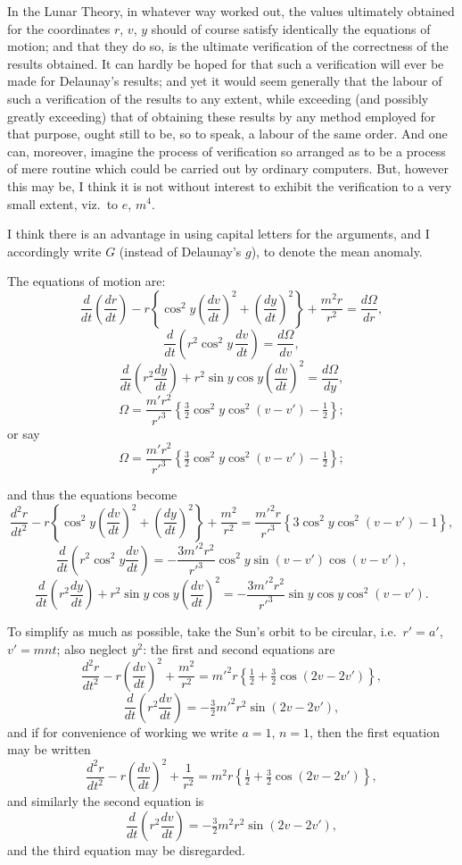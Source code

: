 \documentclass[11pt,a4paper]{article}
\begin{document}
In the Lunar Theory, in whatever way worked out, the values ultimately obtained for the coordinates $r$, $v$, $y$ should of course satisfy identically the equations of motion; and that they do so, is the ultimate verification of the correctness of the results obtained. It can hardly be hoped for that such a verification will ever be made for Delaunay's results; and yet it would seem generally that the labour of such a verification of the results to any extent, while exceeding (and possibly greatly exceeding) that of obtaining these results by any method employed for that purpose, ought still to be, so to speak, a labour of the same order. And one can, moreover, imagine the process of verification so arranged as to be a process of mere routine which could be carried out by ordinary computers. But, however this may be, I think it is not without interest to exhibit the verification to a very small extent, viz.\ to $e$, $m^4$.

I think there is an advantage in using capital letters for the arguments, and I accordingly write $G$ (instead of Delaunay's $g$), to denote the mean anomaly.

The equations of motion are:
\[
\frac{d}{dt}\!\left(\frac{dr}{dt}\right) - r\left\{\cos^2 y\left(\frac{dv}{dt}\right)^2 + \left(\frac{dy}{dt}\right)^2\right\} + \frac{m^2 r}{r^2} = \frac{d\Omega}{dr},
\]
\[
\frac{d}{dt}\!\left(r^2 \cos^2 y \,\frac{dv}{dt}\right) = \frac{d\Omega}{dv},
\]
\[
\frac{d}{dt}\!\left(r^2 \frac{dy}{dt}\right) + r^2 \sin y \cos y \left(\frac{dv}{dt}\right)^2 = \frac{d\Omega}{dy},
\]
\[
\Omega = \frac{m'r^2}{r'^3}\!\left\{\tfrac{3}{2}\cos^2 y \cos^2 (v - v') - \tfrac{1}{2}\right\};
\]
or say
\[
\Omega = \frac{m'r^2}{r'^3}\!\left\{\tfrac{3}{2}\cos^2 y \cos^2(v - v') - \tfrac{1}{2}\right\};
\]

and thus the equations become
\[
\frac{d^2 r}{dt^2} - r\!\left\{\cos^2 y\!\left(\frac{dv}{dt}\right)^{\!2} + \!\left(\frac{dy}{dt}\right)^{\!2}\right\} + \frac{m^2}{r^2} = \frac{m'^2 r}{r'^3}\!\left\{3\cos^2 y \cos^2(v - v') - 1\right\},
\]
\[
\frac{d}{dt}\!\left(r^2 \cos^2 y \frac{dv}{dt}\right) = -\frac{3 m'^2 r^2}{r'^3}\cos^2 y \sin(v - v')\cos(v - v'),
\]
\[
\frac{d}{dt}\!\left(r^2 \frac{dy}{dt}\right) + r^2 \sin y \cos y\!\left(\frac{dv}{dt}\right)^2 = -\frac{3 m'^2 r^2}{r'^3}\sin y \cos y \cos^2(v - v').
\]

To simplify as much as possible, take the Sun's orbit to be circular, i.e.\ $r' = a'$, $v' = m n t$; also neglect $y^2$: the first and second equations are
\[
\frac{d^2 r}{dt^2} - r\!\left(\frac{dv}{dt}\right)^{\!2} + \frac{m^2}{r^2} = m'^2 r\!\left\{\tfrac{1}{2} + \tfrac{3}{2}\cos(2v - 2v')\right\},
\]
\[
\frac{d}{dt}\!\left(r^2 \frac{dv}{dt}\right) = -\tfrac{3}{2} m'^2 r^2 \sin(2v - 2v'),
\]
and if for convenience of working we write $a = 1$, $n = 1$, then the first equation may be written
\[
\frac{d^2 r}{dt^2} - r\!\left(\frac{dv}{dt}\right)^{\!2} + \frac{1}{r^2} = m^2 r\!\left\{\tfrac{1}{2} + \tfrac{3}{2}\cos(2v - 2v')\right\},
\]
and similarly the second equation is
\[
\frac{d}{dt}\!\left(r^2 \frac{dv}{dt}\right) = -\tfrac{3}{2} m^2 r^2 \sin(2v - 2v'),
\]
and the third equation may be disregarded.
\end{document}
